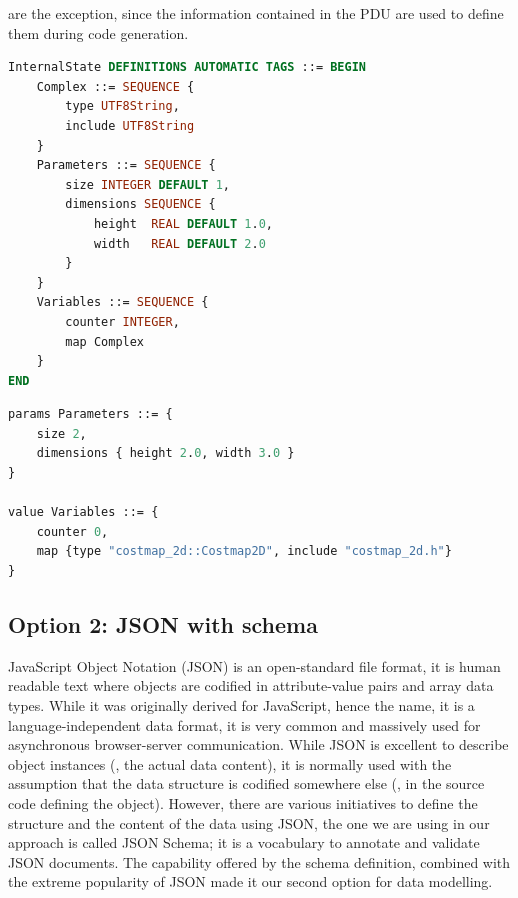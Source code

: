 are the exception, since the information contained in the PDU are used to define them during code generation.

\begin{lstlisting}[language=ASN1,caption={Internal state of a node modelled using ASN.1},label=lst:asn1-ros-is]
InternalState DEFINITIONS AUTOMATIC TAGS ::= BEGIN
	Complex ::= SEQUENCE {
		type UTF8String,
		include UTF8String
	}
	Parameters ::= SEQUENCE {
		size INTEGER DEFAULT 1,
		dimensions SEQUENCE {
			height	REAL DEFAULT 1.0,
			width	REAL DEFAULT 2.0
		}
	}
	Variables ::= SEQUENCE {
		counter INTEGER,
		map Complex
	}
END
\end{lstlisting}

\begin{lstlisting}[language=ASN1,caption={Internal state instance defined in ASN.1},label=lst:asn1-ros-is1]
params Parameters ::= {
	size 2, 
	dimensions { height 2.0, width 3.0 }
}

value Variables ::= { 
	counter 0,
	map {type "costmap_2d::Costmap2D", include "costmap_2d.h"}
}
\end{lstlisting}
 
\subsection{Option 2: JSON with schema}
 JavaScript Object Notation (JSON) is an open-standard file format, it is human readable text where objects are codified in attribute-value pairs and array data types. While it was originally derived for JavaScript, hence the name, it is a language-independent data format, it is very common and massively used for asynchronous browser-server communication. While JSON is excellent to describe object instances (\ie, the actual data content), it is normally used with the assumption that the data structure is codified somewhere else (\eg, in the source code defining the object). However, there are various initiatives to define the structure and the content of the data using JSON, the one we are using in our approach is called JSON Schema; it is a vocabulary to annotate and validate JSON documents. The capability offered by the schema definition, combined with the extreme popularity of JSON made it our second option for data modelling.
 
